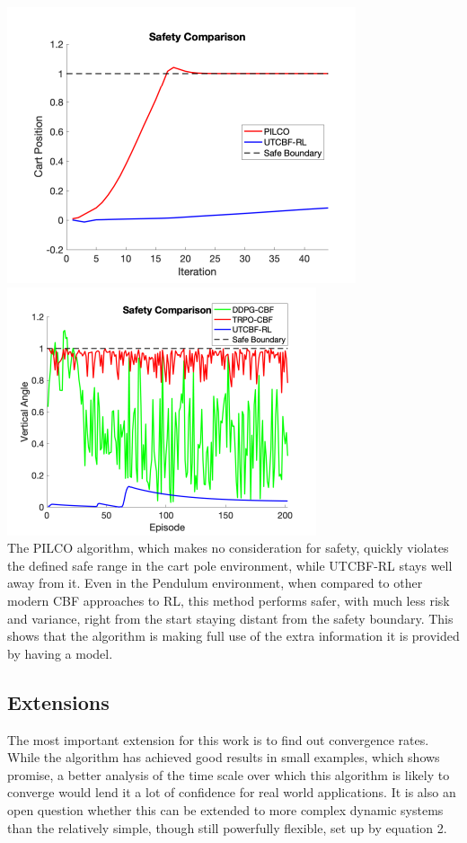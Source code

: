 \documentclass{article}
\begin{document}
\includegraphics[scale = 0.8]{SafetyComparison.png}
\includegraphics[scale = 0.85]{SafetyComparison-CBF.png}\\
The PILCO algorithm, which makes no consideration for safety, quickly violates the defined safe range in the cart pole environment, while UTCBF-RL stays well away from it. Even in the Pendulum environment, when compared to other modern CBF approaches to RL, this method performs safer, with much less risk and variance, right from the start staying distant from the safety boundary. This shows that the algorithm is making full use of the extra information it is provided by having a model. 
\subsection{Extensions}
The most important extension for this work is to find out convergence rates. While the algorithm has achieved good results in small examples, which shows promise, a better analysis of the time scale over which this algorithm is likely to converge would lend it a lot of confidence for real world applications. It is also an open question whether this can be extended to more complex dynamic systems than the relatively simple, though still powerfully flexible, set up by equation 2.
\end{document}

